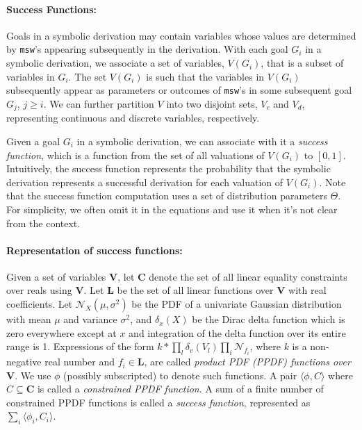 \paragraph{Success Functions:}
Goals in a symbolic derivation may contain variables whose values are
determined by \texttt{msw}'s appearing subsequently in the
derivation.  With each goal $G_i$ in a symbolic derivation, we
associate a set of variables, $V(G_i)$, that is a subset of variables
in $G_i$.  The set $V(G_i)$ is such that the variables in $V(G_i)$ 
subsequently appear as parameters or
outcomes of \texttt{msw}'s in some subsequent  goal $G_j$, $j \geq i$.
We can further partition $V$ into two disjoint sets, $V_c$ and $V_d$,
representing continuous and discrete variables,
respectively.  

Given a goal $G_i$ in a symbolic derivation, we can associate with it a
\emph{success function}, which is a function from the set of all
valuations of $V(G_i)$ to $[0,1]$.  Intuitively, the success function
represents the probability that the symbolic derivation represents a
successful derivation for each valuation of $V(G_i)$. 
Note that the success function computation uses a set of distribution parameters $\Theta$.
For simplicity, we often omit it in the equations and use it when it's not clear from the context.
 
\paragraph{Representation of success functions:}
Given a set of variables $\mathbf{V}$, let $\mathbf{C}$ denote the set
of all linear equality constraints over reals using
$\mathbf{V}$.  Let $\mathbf{L}$ be the set of all linear functions over
$\mathbf{V}$ with real coefficients.  Let
$\mathcal{N}_{X}(\mu,\sigma^2)$ be the PDF of a univariate Gaussian
distribution with mean $\mu$ and variance $\sigma^2$, and $\delta_{x}(X)$ be the Dirac delta function which is zero everywhere except at $x$ and integration of the delta function over its entire range is 1.  Expressions of
the form $k*\prod_{l} \delta_{v}(V_{l}) \prod_{i} \mathcal{N}_{f_i}$, where $k$ is a non-negative
real number and $f_i \in \mathbf{L}$, are called \emph{product PDF
  (PPDF) functions 
  over} $\mathbf{V}$.  We use $\phi$ (possibly subscripted) to denote
such functions.  A pair $\langle \phi, C\rangle$ where $C \subseteq \mathbf{C}$ is
called a \emph{constrained PPDF function}. A sum of a finite number of
constrained PPDF functions is called a \emph{success function}, represented as
$\sum_{i} \langle \phi_{i}, C_{i} \rangle$.

